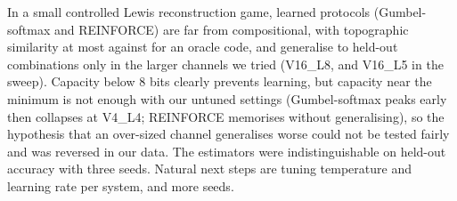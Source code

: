 In a small controlled Lewis reconstruction game, learned protocols (Gumbel-softmax and REINFORCE) are far from compositional, with topographic similarity at most  against  for an oracle code, and generalise to held-out combinations only in the larger channels we tried (V16\_L8, and V16\_L5 in the sweep). Capacity below 8 bits clearly prevents learning, but capacity near the minimum is not enough with our untuned settings (Gumbel-softmax peaks early then collapses at V4\_L4; REINFORCE memorises without generalising), so the hypothesis that an over-sized channel generalises worse could not be tested fairly and was reversed in our data. The estimators were indistinguishable on held-out accuracy with three seeds. Natural next steps are tuning temperature and learning rate per system, and more seeds.
